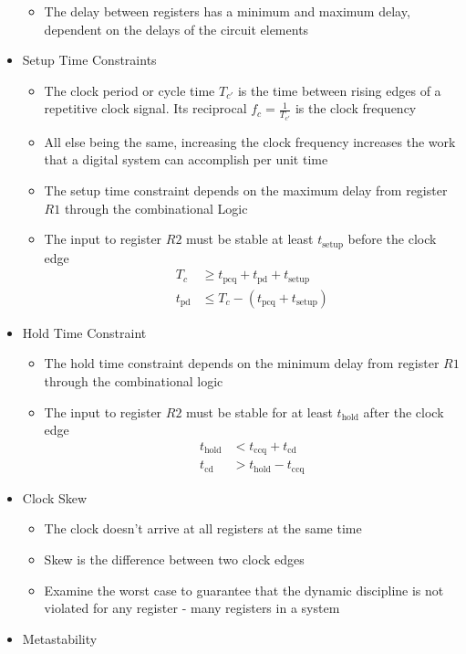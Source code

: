 \documentclass[a4paper]{article}
\begin{document}
\begin{itemize}
\begin{itemize}
\begin{center}
\end{center}
\item The delay between registers has a minimum and maximum delay, dependent on the delays of the circuit elements
\end{itemize}
\item Setup Time Constraints
\begin{itemize}
\item The clock period or cycle time $T_{c'}$ is the time between rising edges of a repetitive clock signal. Its reciprocal $f_c=\frac{1}{T_{c'}}$ is the clock frequency
\item All else being the same, increasing the clock frequency increases the work that a digital system can accomplish per unit time
\item The setup time constraint depends on the maximum delay from register $R1$ through the combinational Logic
\item The input to register $R2$ must be stable at least $t_\text{setup}$ before the clock edge
\begin{align*}
T_c&\geq t_\text{pcq}+t_\text{pd}+t_\text{setup}\\
t_\text{pd}&\leq T_c-(t_\text{pcq}+t_\text{setup})
\end{align*}
\end{itemize}
\item Hold Time Constraint
\begin{itemize}
\item The hold time constraint depends on the minimum delay from register $R1$ through the combinational logic
\item The input to register $R2$ must be stable for at least $t_\text{hold}$ after the clock edge
\begin{align*}
t_\text{hold}&<t_\text{ccq}+t_\text{cd}\\
t_\text{cd}&>t_\text{hold}-t_\text{ccq}
\end{align*}
\end{itemize}
\item Clock Skew
\begin{itemize}
\item The clock doesn't arrive at all registers at the same time
\item Skew is the difference between two clock edges
\item Examine the worst case to guarantee that the dynamic discipline is not violated for any register - many registers in a system
\end{itemize}
\item Metastability

\end{itemize}
\end{document}
